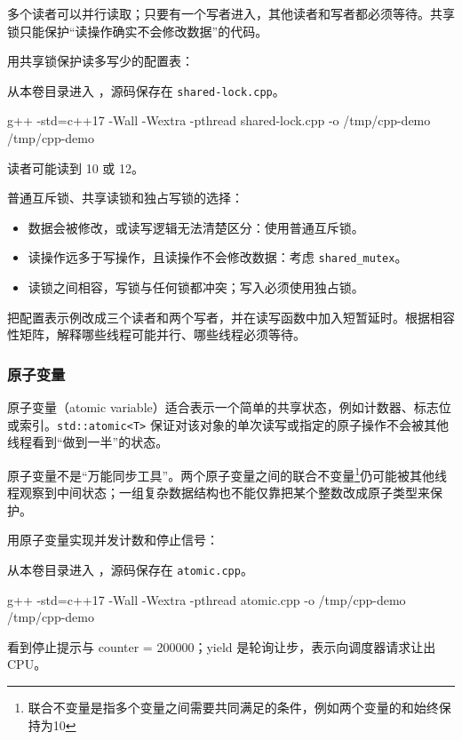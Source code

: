 多个读者可以并行读取；只要有一个写者进入，其他读者和写者都必须等待。共享锁只能保护“读操作确实不会修改数据”的代码。

\begin{example}
用共享锁保护读多写少的配置表：



从本卷目录进入 ，源码保存在 \texttt{shared-lock.cpp}。
\begin{tbash}
g++ -std=c++17 -Wall -Wextra -pthread shared-lock.cpp -o /tmp/cpp-demo
/tmp/cpp-demo
\end{tbash}
读者可能读到 10 或 12。
\end{example}

\begin{conclusion}
普通互斥锁、共享读锁和独占写锁的选择：
\begin{itemize}
    \item 数据会被修改，或读写逻辑无法清楚区分：使用普通互斥锁。
    \item 读操作远多于写操作，且读操作不会修改数据：考虑 \texttt{shared\_mutex}。
    \item 读锁之间相容，写锁与任何锁都冲突；写入必须使用独占锁。
\end{itemize}
\end{conclusion}

\begin{exercise}\label{ex:v1-cpp-shared-lock}

把配置表示例改成三个读者和两个写者，并在读写函数中加入短暂延时。根据相容性矩阵，解释哪些线程可能并行、哪些线程必须等待。
\end{exercise}

\subsubsection{原子变量}
原子变量（atomic variable）适合表示一个简单的共享状态，例如计数器、标志位或索引。\texttt{std::atomic<T>} 保证对该对象的单次读写或指定的原子操作不会被其他线程看到“做到一半”的状态。

原子变量不是“万能同步工具”。两个原子变量之间的联合不变量\footnote{联合不变量是指多个变量之间需要共同满足的条件，例如两个变量的和始终保持为10}仍可能被其他线程观察到中间状态；一组复杂数据结构也不能仅靠把某个整数改成原子类型来保护。

\begin{example}
用原子变量实现并发计数和停止信号：



从本卷目录进入 ，源码保存在 \texttt{atomic.cpp}。
\begin{tbash}
g++ -std=c++17 -Wall -Wextra -pthread atomic.cpp -o /tmp/cpp-demo
/tmp/cpp-demo
\end{tbash}
看到停止提示与 counter = 200000；yield 是轮询让步，表示向调度器请求让出 CPU。
\end{example}


